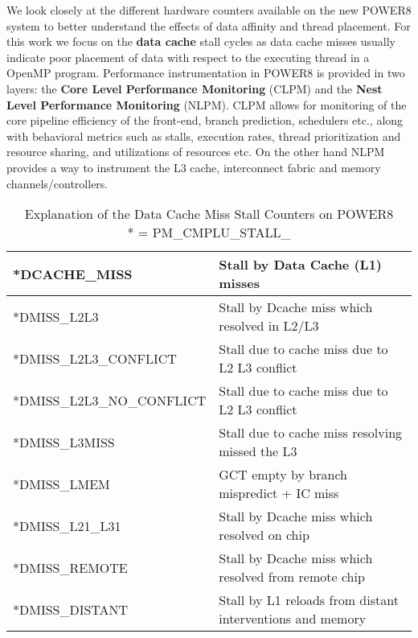 We look closely at the different hardware counters available on the new POWER8 system to better understand the effects of data affinity and thread placement. For this work we focus on the \textbf{data cache} stall cycles %
as data cache misses usually indicate poor placement of data with respect to the executing thread in a OpenMP program. Performance instrumentation in POWER8 is provided in two layers: the \textbf{Core Level Performance Monitoring} (CLPM) and the \textbf{Nest Level Performance Monitoring} (NLPM). CLPM allows for monitoring of the core pipeline efficiency of the front-end, branch prediction, schedulers etc., along with behavioral metrics such as stalls, execution rates, thread prioritization and resource sharing, and utilizations of resources etc. On the other hand NLPM provides a way to instrument the L3 cache, interconnect fabric and memory channels/controllers. 
%
\begin{table*}[h]
\vspace{-0.5pc}
\centering
\begin{tabular} { | l | l |}
\hline
*DCACHE\_MISS & Stall by Data Cache (L1) misses\\  \hline
*DMISS\_L2L3 & Stall by Dcache miss which resolved in L2/L3 \\  \hline
*DMISS\_L2L3\_CONFLICT & Stall due to cache miss due to L2 L3 conflict \\  \hline
*DMISS\_L2L3\_NO\_CONFLICT & Stall due to cache miss due to L2 L3 conflict \\ \hline
*DMISS\_L3MISS & Stall due to cache miss resolving missed the L3 \\ \hline
*DMISS\_LMEM & GCT empty by branch mispredict + IC miss\\ \hline
*DMISS\_L21\_L31 &  Stall by Dcache miss which resolved on chip \\ \hline%
*DMISS\_REMOTE  & Stall by Dcache miss which resolved from remote chip \\ \hline%
*DMISS\_DISTANT & Stall by L1 reloads from distant interventions and memory \\ \hline
 \end{tabular}
 \caption{Explanation of the Data Cache Miss Stall Counters on POWER8 \\ * = PM\_CMPLU\_STALL\_}
\label{tab:hwct}
\end{table*}
